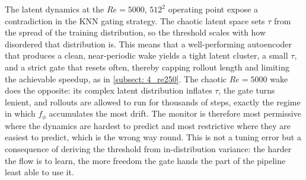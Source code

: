 The latent dynamics at the $Re=5000$, $512^2$ operating point expose a contradiction in the KNN gating strategy. The chaotic latent space sets $\tau$ from the spread of the training distribution, so the threshold scales with how disordered that distribution is. This means that a well-performing autoencoder that produces a clean, near-periodic wake yields a tight latent cluster, a small $\tau$, and a strict gate that resets often, thereby capping rollout length and limiting the achievable speedup, as in \autoref{subsect: 4_re250}. The chaotic $Re=5000$ wake does the opposite: its complex latent distribution inflates $\tau$, the gate turns lenient, and rollouts are allowed to run for thousands of steps, exactly the regime in which $f_\phi$ accumulates the most drift.  The monitor is therefore most permissive where the dynamics are hardest to predict and most restrictive where they are easiest to predict, which is the wrong way round. This is not a tuning error but a consequence of deriving the threshold from in-distribution variance: the harder the flow is to learn, the more freedom the gate hands the part of the pipeline least able to use it.



% 

